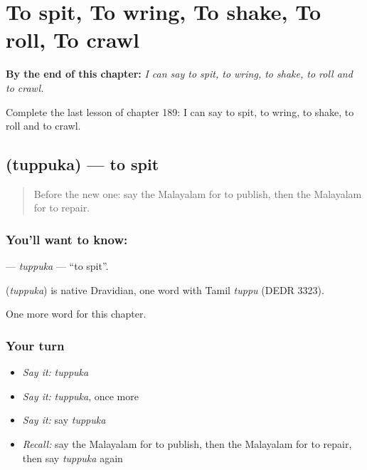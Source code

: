 
\chapter{To spit, To wring, To shake, To roll, To crawl}
\label{ch:ml-to-spit-to-wring-to-shake-to-roll-to-crawl}

\begin{chapteropening}
\textbf{By the end of this chapter:} \emph{I can say to spit, to wring, to shake, to roll and to crawl.}

Complete the last lesson of chapter 189: I can say to spit, to wring, to shake, to roll and to crawl.
\end{chapteropening}

\section[\texorpdfstring{\ml{തുപ്പുക} (tuppuka)}{തുപ്പുക (tuppuka)}]{ (tuppuka) — to spit}

\label{lesson:ML-C189-tuppuka}



\begin{quote}
Before the new one: say the Malayalam for to publish, then the Malayalam for to repair.
\end{quote}

\subsection*{You'll want to know: }
\textbf{} — \emph{tuppuka} — \textquotedblleft{}to spit\textquotedblright{}.

\begin{cousinweb}
\textbf{} (\emph{tuppuka}) is native Dravidian, one word with Tamil \emph{tuppu} (DEDR 3323).
\end{cousinweb}

\begin{grammarlens}[title={What you've built}]
One more word for this chapter.
\end{grammarlens}

\subsection*{Your turn}
\begin{itemize}
\raggedright
  \item \emph{Say it:} \emph{tuppuka}
  \item \emph{Say it:} \emph{tuppuka}, once more
  \item \emph{Say it:} say \emph{tuppuka}
  \item \emph{Recall:} say the Malayalam for to publish, then the Malayalam for to repair, then say \emph{tuppuka} again
\end{itemize}

